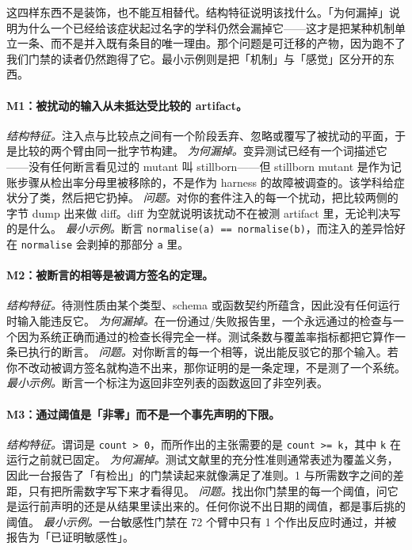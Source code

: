 \documentclass[UTF8,11pt]{ctexart}
\begin{document}
这四样东西不是装饰，也不能互相替代。结构特征说明该找什么。「为何漏掉」说明为什么一个已经给该症状起过名字的学科仍然会漏掉它——这才是把某种机制单立一条、而不是并入既有条目的唯一理由。那个问题是可迁移的产物，因为跑不了我们门禁的读者仍然跑得了它。最小示例则是把「机制」与「感觉」区分开的东西。

\paragraph{M1：被扰动的输入从未抵达受比较的 artifact。}
\emph{结构特征。}注入点与比较点之间有一个阶段丢弃、忽略或覆写了被扰动的平面，于是比较的两个臂由同一批字节构建。
\emph{为何漏掉。}变异测试已经有一个词描述它——没有任何断言看见过的 mutant 叫 stillborn——但 stillborn mutant 是作为记账步骤从检出率分母里被移除的，不是作为 harness 的故障被调查的。该学科给症状分了类，然后把它扔掉。
\emph{问题。}对你的套件注入的每一个扰动，把比较两侧的字节 dump 出来做 diff。diff 为空就说明该扰动不在被测 artifact 里，无论判决写的是什么。
\emph{最小示例。}断言 \texttt{normalise(a) == normalise(b)}，而注入的差异恰好在 \texttt{normalise} 会剥掉的那部分 \texttt{a} 里。

\paragraph{M2：被断言的相等是被调方签名的定理。}
\emph{结构特征。}待测性质由某个类型、schema 或函数契约所蕴含，因此没有任何运行时输入能违反它。
\emph{为何漏掉。}在一份通过/失败报告里，一个永远通过的检查与一个因为系统正确而通过的检查长得完全一样。测试条数与覆盖率指标都把它算作一条已执行的断言。
\emph{问题。}对你断言的每一个相等，说出能反驳它的那个输入。若你不改动被调方签名就构造不出来，那你证明的是一条定理，不是测了一个系统。
\emph{最小示例。}断言一个标注为返回非空列表的函数返回了非空列表。

\paragraph{M3：通过阈值是「非零」而不是一个事先声明的下限。}
\emph{结构特征。}谓词是 \texttt{count > 0}，而所作出的主张需要的是 \texttt{count >= k}，其中 \texttt{k} 在运行之前就已固定。
\emph{为何漏掉。}测试文献里的充分性准则通常表述为覆盖义务，因此一台报告了「有检出」的门禁读起来就像满足了准则。1 与所需数字之间的差距，只有把所需数字写下来才看得见。
\emph{问题。}找出你门禁里的每一个阈值，问它是运行前声明的还是从结果里读出来的。任何你说不出日期的阈值，都是事后挑的阈值。
\emph{最小示例。}一台敏感性门禁在 72 个臂中只有 1 个作出反应时通过，并被报告为「已证明敏感性」。
\end{document}
